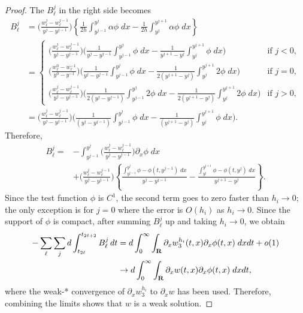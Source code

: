 \documentclass[11pt]{amsart}
\def\R{{\bf R}}
\def\R{\mathbb{R}}
\def\R{{\bf R}}
\begin{document}
\begin{proof}
The $B^j_\ell$ in the right side becomes
\begin{align*}
 B_\ell^j &= \Big(\tfrac{w^{j}_{\ell} - w^{j-1}_{\ell}}{y^{j}-y^{j-1}}\Big)
        \left\{\frac{1}{2h}\int_{y^{j-1}}^{y^{j}} \alpha\phi  \; dx -
        \frac{1}{2h}\int_{y^{j}}^{y^{j+1}} \alpha\phi  \; dx\right\}\\
     &= \left\{\begin{array}{ll}
        \Big(\tfrac{w^{j}_{\ell} - w^{j-1}_{\ell}}{y^{j}-y^{j-1}}\Big)
        \bigg( \frac{1}{y^j-y^{j-1}}\int_{y^{j-1}}^{y^{j}} \phi  \; dx-
        \frac{1}{y^{j+1}-y^{j}}\int_{y^{j}}^{y^{j+1}} \phi  \; dx \bigg)
        & \text{if } j<0,\\
        \Big(\tfrac{w^{0}_{\ell} - w^{-1}_{\ell}}{y^{0}-y^{-1}}\Big)
        \bigg( \frac{1}{y^j-y^{j-1}}\int_{y^{j-1}}^{y^{j}} \phi  \; dx-
        \frac{1}{2(y^{j+1}-y^{j})}\int_{y^{j}}^{y^{j+1}} 2\phi  \; dx
        \bigg) & \text{if } j=0,\\
        \Big(\tfrac{w^{j}_{\ell} - w^{j-1}_{\ell}}{y^{j}-y^{j-1}}\Big)
        \bigg( \frac{1}{2(y^j-y^{j-1})}\int_{y^{j-1}}^{y^{j}} 2\phi  \; dx-
        \frac{1}{2(y^{j+1}-y^{j})}\int_{y^{j}}^{y^{j+1}} 2\phi  \; dx
        \bigg) & \text{if } j>0,
       \end{array}\right.\\
     &=\Big(\tfrac{w^{j}_{\ell} - w^{j-1}_{\ell}}{y^{j}-y^{j-1}}\Big)
        \bigg( \frac{1}{(y^j-y^{j-1})}\int_{y^{j-1}}^{y^{j}} \phi  \; dx-
        \frac{1}{(y^{j+1}-y^{j})}\int_{y^{j}}^{y^{j+1}} \phi  \; dx
        \bigg).
\end{align*}
Therefore,
\begin{align*}
 B_\ell^j =&-\int_{y^{j-1}}^{y^{j}}\Big(\tfrac{w^{j}_{\ell} -
 w^{j-1}_{\ell}}{y^{j}-y^{j-1}}\Big)\partial_x\phi \;dx \\
     & + \Big(\tfrac{w^{j}_{\ell} -
     w^{j-1}_{\ell}}{y^{j}-y^{j-1}}\Big)\left\{
        \frac{\int_{y^{j-1}}^{y^{j}} \phi -\phi(t,y^{j-1}) \;
        dx}{y^j-y^{j-1}} - \frac{\int_{y^{j}}^{y^{j+1}} \phi -\phi(t,y^{j})
        \; dx}{y^{j+1}-y^j} \right\}.
\end{align*}
Since the test function $\phi$ is $C^1$, the second term goes to zero faster than $h_i\to0$; the only exception is for $j=0$ where the error is $O(h_i)$ as $h_i\to0$.
Since the support of $\phi$ is compact, after summing $B_\ell^j$ up and taking $h_i\to0$, we obtain
\begin{align*}
-\sum_{\ell}\sum_{j}d\int_{t_{2\ell}}^{t_{2\ell+2}}B_\ell^j\,dt &= d\int_0^\infty\int_\R \partial_x w_3^{h_i}(t,x) \partial_x \phi(t,x) \;
dxdt + o(1) \\
&\rightarrow d\int_0^\infty\int_\R \partial_x w(t,x) \partial_x \phi(t,x) \; dxdt,
\end{align*}
where the weak-* convergence of $\partial_x w_3^{h_i}$ to $\partial_x w$ has been used.
Therefore, combining the limits shows that $w$ is a weak solution.
\end{proof}
\end{document}
